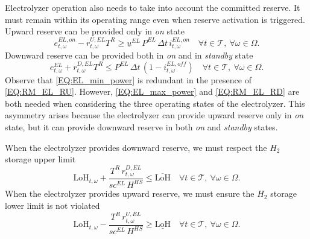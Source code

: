 \documentclass{article}
\begin{document}
Electrolyzer operation also needs to take into account the committed reserve. It
must remain within its operating range even when reserve activation is triggered.
Upward reserve can be provided only in \emph{on} state
\begin{equation} \label{EQ:RM_EL_RU}
    e^{EL,on}_{t,\omega} - r^{U, EL}_{t, \omega} T^R
    \geq \underline{u}^{EL}\, P^{EL}\, \Delta t\, i^{EL,on}_{t,\omega}
    \quad \forall t \in \mathcal{T},\ \forall \omega \in \Omega.
\end{equation}
Downward reserve can be provided both in \emph{on} and in \emph{standby} state
\begin{equation} \label{EQ:RM_EL_RD}
    e^{EL}_{t,\omega} + r^{D, EL}_{t, \omega} T^R
    \leq P^{EL}\, \Delta t\, (1 - i^{EL,off}_{t,\omega})
    \quad \forall t \in \mathcal{T},\ \forall \omega \in \Omega.
\end{equation}
Observe that \eqref{EQ:EL_min_power} is redundant in the presence of
\eqref{EQ:RM_EL_RU}. However, \eqref{EQ:EL_max_power} and \eqref{EQ:RM_EL_RD}
are both needed when considering the three operating states of the electrolyzer.
This asymmetry arises because the electrolyzer can provide upward reserve only
in \emph{on} state, but it can provide downward reserve in both \emph{on} and
\emph{standby} states.

When the electrolyzer provides downward reserve, we must respect the $H_{2}$
storage upper limit
\begin{equation} \label{EQ:RM_EL_RD_LOH}
    \text{LoH}_{t,\omega}
    + \frac{T^R\, r^{D, EL}_{t,\omega}}{sc^{EL}\, H^{HS}}
    \leq \overline{\text{LoH}}
    \quad \forall t \in \mathcal{T},\ \forall \omega \in \Omega.
\end{equation}
When the electrolyzer provides upward reserve, we must ensure the $H_{2}$
storage lower limit is not violated
\begin{equation} \label{EQ:RM_EL_RU_LOH}
    \text{LoH}_{t,\omega}
    - \frac{T^R\, r^{U, EL}_{t,\omega}}{sc^{EL}\, H^{HS}}
    \geq \underline{\text{LoH}}
    \quad \forall t \in \mathcal{T},\ \forall \omega \in \Omega.
\end{equation}
\end{document}
